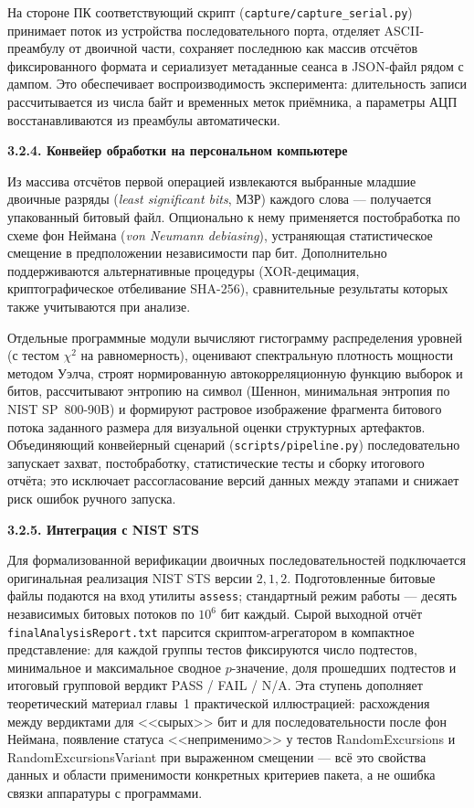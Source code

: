 На стороне ПК соответствующий скрипт (\texttt{capture/capture\_serial.py}) принимает
поток из устройства последовательного порта, отделяет ASCII-преамбулу от двоичной части,
сохраняет последнюю как массив отсчётов фиксированного формата и сериализует
метаданные сеанса в JSON-файл рядом с дампом. Это обеспечивает воспроизводимость
эксперимента: длительность записи рассчитывается из числа байт и временных меток
приёмника, а параметры АЦП восстанавливаются из преамбулы автоматически.

\textbf{3.2.4. Конвейер обработки на персональном компьютере}

Из массива отсчётов первой операцией извлекаются выбранные младшие двоичные разряды
(\textit{least significant bits}, МЗР) каждого слова --- получается упакованный битовый
файл. Опционально к нему применяется постобработка по схеме фон Неймана (\textit{von
Neumann debiasing}), устраняющая статистическое смещение в предположении независимости
пар бит. Дополнительно поддерживаются альтернативные процедуры (XOR-децимация,
криптографическое отбеливание SHA-256), сравнительные результаты которых также
учитываются при анализе.

Отдельные программные модули вычисляют гистограмму распределения уровней (с тестом
$\chi^2$ на равномерность), оценивают спектральную плотность мощности методом Уэлча,
строят нормированную автокорреляционную функцию выборок и битов, рассчитывают
энтропию на символ (Шеннон, минимальная энтропия по NIST SP~800-90B) и формируют
растровое изображение фрагмента битового потока заданного размера для визуальной оценки
структурных артефактов. Объединяющий конвейерный сценарий (\texttt{scripts/pipeline.py})
последовательно запускает захват, постобработку, статистические тесты и сборку
итогового отчёта; это исключает рассогласование версий данных между этапами и
снижает риск ошибок ручного запуска.

\textbf{3.2.5. Интеграция с NIST STS}

Для формализованной верификации двоичных последовательностей подключается оригинальная
реализация NIST STS версии $2{,}1{,}2$. Подготовленные битовые файлы подаются на вход
утилиты \texttt{assess}; стандартный режим работы --- десять независимых битовых потоков
по $10^6$ бит каждый. Сырой выходной отчёт \texttt{finalAnalysisReport.txt} парсится
скриптом-агрегатором в компактное представление: для каждой группы тестов фиксируются
число подтестов, минимальное и максимальное сводное $p$-значение, доля прошедших
подтестов и итоговый групповой вердикт PASS / FAIL / N/A. Эта ступень дополняет
теоретический материал главы~1 практической иллюстрацией: расхождения между
вердиктами для <<сырых>> бит и для последовательности после фон Неймана, появление
статуса <<неприменимо>> у тестов RandomExcursions и RandomExcursionsVariant при
выраженном смещении --- всё это свойства данных и области применимости конкретных
критериев пакета, а не ошибка связки аппаратуры с программами.

